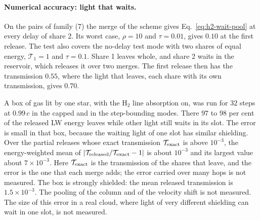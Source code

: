 \paragraph{Numerical accuracy: light that waits.} On the pairs of family (7)
the merge of the scheme gives Eq.~\eqref{eq:h2-wait-pool} at every
delay of share 2. Its worst case, $\rho=10$ and $\tau=0.01$, gives $0.10$ at
the first release. The test also covers the no-delay test mode with two
shares of equal energy, $\mathcal T_1=1$ and $\tau=0.1$. Share 1 leaves
whole, and share 2 waits in the reservoir, which releases it over two
merges. The first release then has the transmission $0.55$, where the light
that leaves, each share with its own transmission, gives $0.70$.

A box of gas lit by one star, with the H$_2$
line absorption on, was run for $32$ steps at $0.99\,c$ in the capped and in
the step-bounding modes. There $97$ to $98$ per cent of the released LW
energy leaves while other light still waits in its slot. The error is small in
that box, because the waiting light of one slot has similar shielding. Over
the partial releases whose exact transmission $\mathcal T_{\rm exact}$ is above $10^{-3}$, the
energy-weighted mean of $|\mathcal T_{\rm released}/\mathcal T_{\rm exact}-1|$
is about $10^{-3}$ and its largest value about $7\times10^{-3}$. Here
$\mathcal T_{\rm exact}$ is the transmission of the shares that leave, and
the error is the one that each merge adds; the error carried over many hops
is not measured. The box is strongly shielded: the mean released transmission
is $1.5\times10^{-3}$. The pooling of the column and of the velocity shift is
not measured. The size of this error in a real cloud, where light of very
different shielding can wait in one slot, is not measured.

